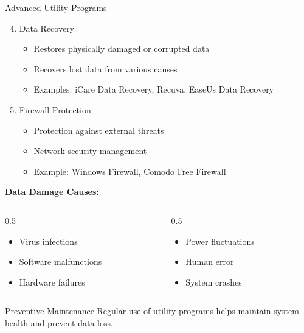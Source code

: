\documentclass[aspectratio=169]{beamer}
\begin{document}
\begin{frame}{Advanced Utility Programs}
    \begin{enumerate}
        \setcounter{enumi}{3}
        \item Data Recovery
        \begin{itemize}
            \item Restores physically damaged or corrupted data
            \item Recovers lost data from various causes
            \item Examples: iCare Data Recovery, Recuva, EaseUs Data Recovery
        \end{itemize}
        
        \item Firewall Protection
        \begin{itemize}
            \item Protection against external threats
            \item Network security management
            \item Example: Windows Firewall, Comodo Free Firewall
        \end{itemize}
    \end{enumerate}
    
    \vspace{0.5cm}
    \textbf{Data Damage Causes:}
    \begin{columns}
        \begin{column}{0.5\textwidth}
            \begin{itemize}
                \item Virus infections
                \item Software malfunctions
                \item Hardware failures
            \end{itemize}
        \end{column}
        \begin{column}{0.5\textwidth}
            \begin{itemize}
                \item Power fluctuations
                \item Human error
                \item System crashes
            \end{itemize}
        \end{column}
    \end{columns}
    
    \begin{alertblock}{Preventive Maintenance}
        Regular use of utility programs helps maintain system health and prevent data loss.
    \end{alertblock}
\end{frame}
\end{document}
